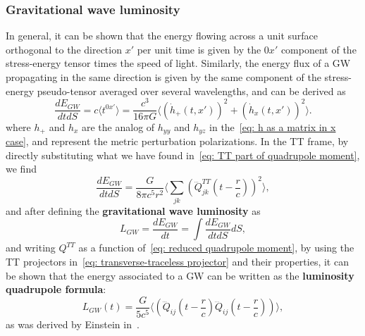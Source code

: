 \subsubsection{Gravitational wave luminosity}
In general, it can be shown that the energy flowing across a unit surface orthogonal to the direction $x'$ per unit time is given by the $0x'$ component of the stress-energy tensor times the speed of light.
Similarly, the energy flux of a GW propagating in the same direction is given by the same component of the stress-energy pseudo-tensor averaged over several wavelengths, and can be derived as
\[
    \frac{dE_{GW}}{dtdS} = c\langle t^{0x'}\rangle = \frac{c^3}{16\pi G}\langle {(\dot{h}_+(t,x'))}^2 + {(\dot{h}_x(t,x'))}^2 \rangle.
\]
where $h_+$ and $h_x$ are the analog of $h_{yy}$ and $h_{yz}$ in the~\eqref{eq: h as a matrix in x case}, and represent the metric perturbation polarizations.
In the TT frame, by directly substituting what we have found in~\eqref{eq: TT part of quadrupole moment}, we find 
\[
    \frac{dE_{GW}}{dtdS} = \frac{G}{8\pi c^5 r^2}\Big\langle \sum_{jk}{\left( \dddot{Q}_{jk}^{TT}(t-\frac{r}{c}) \right)}^2 \Big\rangle,
\]
and after defining the \textbf{gravitational wave luminosity} as
\[
    L_{GW} = \frac{dE_{GW}}{dt} = \int \frac{dE_{GW}}{dtdS}dS,
\]
and writing $Q^{TT}$ as a function of~\eqref{eq: reduced quadrupole moment}, by using the TT projectors in~\eqref{eq: transverse-traceless projector} and their properties, it can be shown that the energy associated to a GW can be written as the \textbf{luminosity quadrupole formula}:
\begin{equation}
    L_{GW}(t) = \frac{G}{5c^5}\Big\langle \left(\dddot{Q}_{ij}\left(t- \frac{r}{c}\right) \dddot{Q}_{ij}\left(t-\frac{r}{c}\right)\right) \Big\rangle,
    \label{eq: luminosity quadrupole formula}
\end{equation}
as was derived by Einstein in~\cite{Einstein_1918}.

